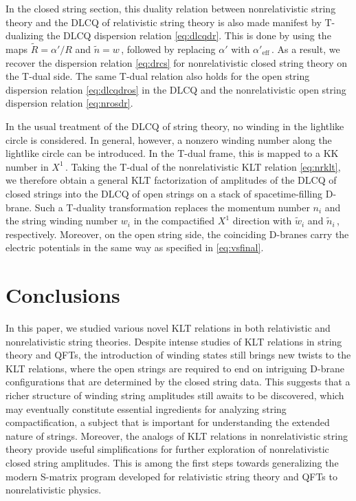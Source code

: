 \documentclass[11pt]{article}
\renewcommand{\tilde}[1]{\widetilde{#1}}
\begin{document}
In the closed string section, this duality relation between nonrelativistic string theory and the DLCQ of relativistic string theory is also made manifest by T-dualizing the DLCQ dispersion relation \eqref{eq:dlcqdr}. This is done by using the maps $\tilde{R} = \alpha' / R$ and $\tilde{n} = w$\,, followed by replacing $\alpha'$ with $\alpha'_\text{eff}$\,. As a result, we recover the dispersion relation \eqref{eq:drcs} for nonrelativistic closed string theory on the T-dual side. The same T-dual relation also holds for the open string dispersion relation \eqref{eq:dlcqdros} in the DLCQ and the nonrelativistic open string dispersion relation \eqref{eq:nrosdr}. 

In the usual treatment of the DLCQ of string theory, no winding in the lightlike circle is considered. In general, however, a nonzero winding number along the lightlike circle can be introduced. In the T-dual frame, this is mapped to a KK number in $X^1$\,. Taking the T-dual of the nonrelativistic KLT relation \eqref{eq:nrklt}, we therefore obtain a general KLT factorization of amplitudes of the DLCQ of closed strings into the DLCQ of open strings on a stack of spacetime-filling D-brane. Such a T-duality transformation replaces the momentum number $n_i$ and the string winding number $w_i$ in the compactified $X^1$ direction with $\tilde{w}_i$ and $\tilde{n}_i$\,, respectively. Moreover, on the open string side, the coinciding D-branes carry the electric potentials in the same way as specified in \eqref{eq:vsfinal}.   

\section{Conclusions} \label{sec:concl}

In this paper, we studied various novel KLT relations in both relativistic and nonrelativistic string theories. Despite intense studies of KLT relations in string theory and QFTs, the introduction of winding states still brings new twists to the KLT relations, where the open strings are required to end on intriguing D-brane configurations that are determined by the closed string data. This suggests that a richer structure of winding string amplitudes still awaits to be discovered, which may eventually constitute essential ingredients for analyzing string compactification, a subject that is important for understanding the extended nature of strings. Moreover, the analogs of KLT relations in nonrelativistic string theory provide useful simplifications for further exploration of nonrelativistic closed string amplitudes. This is among the first steps towards generalizing the modern S-matrix program developed for relativistic string theory and QFTs to nonrelativistic physics. 
\end{document}
